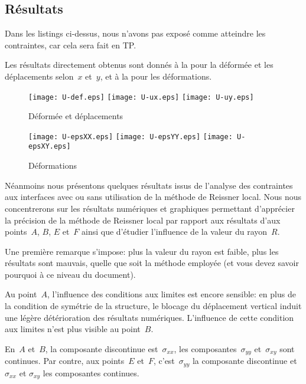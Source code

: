 \medskip
\subsection{Résultats}

Dans les listings ci-dessus, nous n'avons pas exposé comme atteindre les contraintes, car cela sera fait en TP.

Les résultats directement obtenus sont donnés à la  pour la déformée et les déplacements selon~$x$ et~$y$,
et à la  pour les déformations.
\begin{figure}[h!]
  \texttt{[image: U-def.eps]} \hfill
  \texttt{[image: U-ux.eps]}\hfill
  \texttt{[image: U-uy.eps]}
  \caption{\label{Fig-poutU-disp} Déformée et déplacements}
\end{figure}
\begin{figure}[h!]
  \texttt{[image: U-epsXX.eps]} \hfill
  \texttt{[image: U-epsYY.eps]}\hfill
  \texttt{[image: U-epsXY.eps]}
  \caption{\label{Fig-poutU-eps} Déformations}
\end{figure}



\medskip
Néanmoins nous présentons quelques résultats issus de l'analyse des contraintes aux interfaces avec ou sans
utilisation de la méthode de Reissner local.
Nous nous concentrerons sur les résultats numériques et graphiques permettant d'apprécier la précision de la
méthode de Reissner local par rapport aux résultats d'\ansys aux points~$A$, $B$, $E$ et~$F$ ainsi que d'étudier
l'influence de la valeur du rayon~$R$.

\medskip
Une première remarque s'impose: plus la valeur du rayon est faible, plus les résultats sont mauvais, quelle que soit la
méthode employée (et vous devez savoir pourquoi à ce niveau du document).

\medskip
Au point~$A$, l'influence des conditions aux limites est encore sensible: en plus de la condition de symétrie de la structure,
le blocage du déplacement vertical induit une légère détérioration des résultats numériques. L'influence
de cette condition aux limites n'est plus visible au point~$B$.

\medskip
En~$A$ et~$B$, la composante discontinue est~$\sigma_{xx}$, les composantes~$\sigma_{yy}$ et~$\sigma_{xy}$ sont
continues. Par contre, aux points~$E$ et~$F$, c'est~$\sigma_{yy}$ la composante discontinue et~$\sigma_{xx}$ et
$\sigma_{xy}$ les composantes continues.

